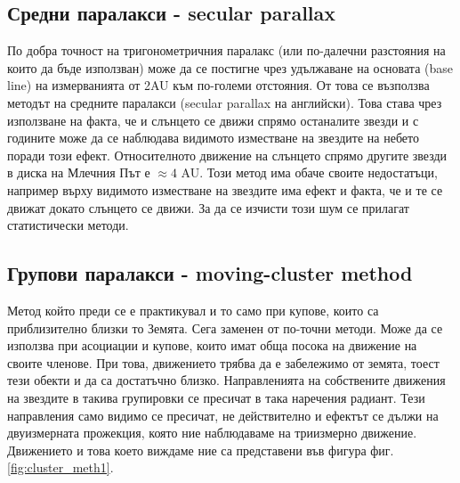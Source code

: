 \documentclass[a4paper,12pt]{article}
\begin{document}
\subsection{Средни паралакси - secular parallax}
По добра точност на тригонометричния паралакс (или по-далечни разстояния на които да бъде използван) може да се постигне чрез удължаване на основата (base line) на измерванията от 2AU към по-големи отстояния. От това се възползва методът на средните паралакси (secular parallax на английски). Това става чрез използване на факта, че и слънцето се движи спрямо останалите звезди и с годините може да се наблюдава видимото изместване на звездите на небето поради този ефект. Относителното движение на слънцето спрямо другите звезди в диска на Млечния Път е $\approx 4$ AU. Този метод има обаче своите недостатъци, например върху видимото изместване на звездите има ефект и факта, че и те се движат докато слънцето се движи. За да се изчисти този шум се прилагат статистически методи. 

\subsection{Групови паралакси - moving-cluster method}
\label{sec:grupov_parallax}
Метод който преди се е практикувал и то само при купове, които са приблизително близки то Земята. Сега заменен от по-точни методи. Може да се използва при асоциации и купове, които имат обща посока на движение на своите членове. При това, движението трябва да е забележимо от земята, тоест тези обекти и да са достатъчно близко. Направленията на собствените движения на звездите в такива групировки се пресичат в така наречения радиант. Тези направления само видимо се пресичат, не действително и ефектът се дължи на двуизмерната прожекция, която ние наблюдаваме на триизмерно движение. Движението и това което виждаме ние са представени във фигура фиг. \ref{fig:cluster_meth1}.


\end{document}
